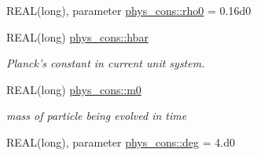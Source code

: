 \begin{DoxyCompactItemize}
REAL(long), parameter \hyperlink{namespacephys__cons_a4b10513970a98ad78b85723c60d9a8b6}{phys\_\-cons::rho0} = 0.16d0
\item 
REAL(long) \hyperlink{namespacephys__cons_a10c52cbe8a9d32eb836e12b67ef7da3b}{phys\_\-cons::hbar}
\begin{DoxyCompactList}\small\item\em Planck's constant in current unit system. \item\end{DoxyCompactList}\item 
REAL(long) \hyperlink{namespacephys__cons_afa35c20a6e2a70b58142d10071eeef10}{phys\_\-cons::m0}
\begin{DoxyCompactList}\small\item\em mass of particle being evolved in time \item\end{DoxyCompactList}\item 
REAL(long), parameter \hyperlink{namespacephys__cons_a553e3e17652770308e6bffcb8fcb5a95}{phys\_\-cons::deg} = 4.d0
\end{DoxyCompactItemize}

